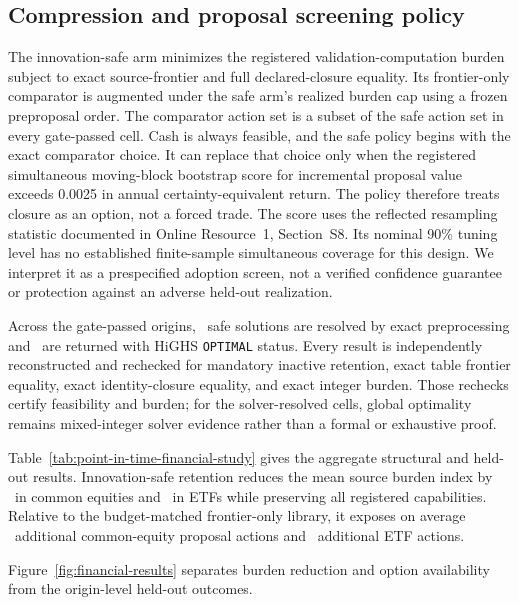 \subsection{Compression and proposal screening policy}

The innovation-safe arm minimizes the registered validation-computation burden
subject to exact source-frontier and full declared-closure equality. Its
frontier-only comparator is augmented under the safe arm's realized burden cap
using a frozen preproposal order. The comparator action set is a subset of the
safe action set in every gate-passed cell. Cash is always feasible, and the
safe policy begins with the exact comparator choice. It can replace that choice
only when the registered simultaneous moving-block bootstrap score for incremental
proposal value exceeds 0.0025 in annual certainty-equivalent return. The policy therefore
treats closure as an option, not a forced trade. The score uses the reflected
resampling statistic documented in Online Resource~1, Section~S8. Its nominal
90\% tuning level has no established finite-sample simultaneous coverage for
this design. We interpret it as a prespecified adoption screen, not a verified
confidence guarantee or protection against an adverse held-out realization.

Across the gate-passed origins, \AORPointInTimePreprocessingSolutions\ safe
solutions are resolved by exact preprocessing and
\AORPointInTimeSolverSolutions\ are returned with HiGHS
\texttt{OPTIMAL} status. Every result is independently reconstructed and
rechecked for mandatory inactive retention, exact table frontier equality,
exact identity-closure equality, and exact integer burden. Those rechecks
certify feasibility and burden; for the solver-resolved cells, global
optimality remains mixed-integer solver evidence rather than a formal or
exhaustive proof.

Table~\ref{tab:point-in-time-financial-study} gives the aggregate structural
and held-out results. Innovation-safe retention reduces the mean source burden
index by \AORPointInTimeEquityBurdenReduction\ in common equities and
\AORPointInTimeETFBurdenReduction\ in ETFs while preserving all registered
capabilities. Relative to the budget-matched frontier-only library, it exposes
on average \AORPointInTimeEquityAddedOptions\ additional common-equity proposal
actions and \AORPointInTimeETFAddedOptions\ additional ETF actions.

\AORPointInTimeFinancialTable

Figure~\ref{fig:financial-results} separates burden reduction and option
availability from the origin-level held-out outcomes.


